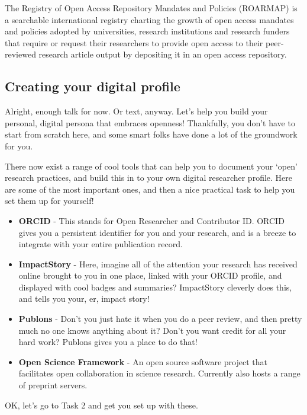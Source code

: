 \documentclass[]{book}
\begin{document}
The Registry of Open Access Repository Mandates and Policies (ROARMAP) is a searchable international registry charting the growth of open access mandates and policies adopted by universities, research institutions and research funders that require or request their researchers to provide open access to their peer-reviewed research article output by depositing it in an open access repository.

\hypertarget{creating-your-digital-profile}{%
\subsection{Creating your digital profile }\label{creating-your-digital-profile}}

Alright, enough talk for now. Or text, anyway. Let's help you build your personal, digital persona that embraces openness! Thankfully, you don't have to start from scratch here, and some smart folks have done a lot of the groundwork for you.

There now exist a range of cool tools that can help you to document your `open' research practices, and build this in to your own digital researcher profile. Here are some of the most important ones, and then a nice practical task to help you set them up for yourself!

\begin{itemize}
\item
  \textbf{ORCID} - This stands for Open Researcher and Contributor ID. ORCID gives you a persistent identifier for you and your research, and is a breeze to integrate with your entire publication record.
\item
  \textbf{ImpactStory} - Here, imagine all of the attention your research has received online brought to you in one place, linked with your ORCID profile, and displayed with cool badges and summaries? ImpactStory cleverly does this, and tells you your, er, impact story!
\item
  \textbf{Publons} - Don't you just hate it when you do a peer review, and then pretty much no one knows anything about it? Don't you want credit for all your hard work? Publons gives you a place to do that!
\item
  \textbf{Open Science Framework} - An open source software project that facilitates open collaboration in science research. Currently also hosts a range of preprint servers.
\end{itemize}

OK, let's go to Task 2 and get you set up with these.
\end{document}
